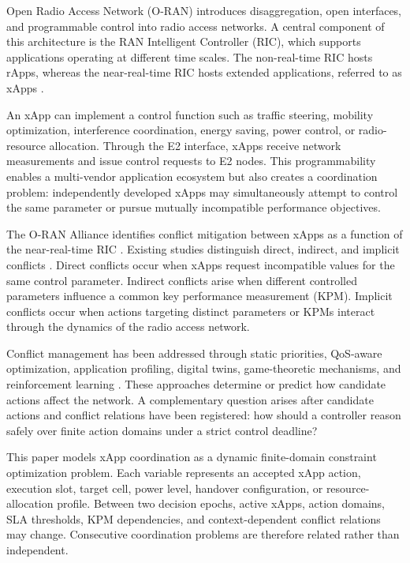 \documentclass[pdflatex,sn-mathphys-num,iicol,oneside]{sn-jnl}
\begin{document}
Open Radio Access Network (O-RAN) introduces disaggregation, open
interfaces, and programmable control into radio access networks.
A central component of this architecture is the RAN Intelligent
Controller (RIC), which supports applications operating at different
time scales. The non-real-time RIC hosts rApps, whereas the
near-real-time RIC hosts extended applications, referred to as xApps
\cite{polese2023oran}.

An xApp can implement a control function such as traffic steering,
mobility optimization, interference coordination, energy saving,
power control, or radio-resource allocation. Through the E2
interface, xApps receive network measurements and issue control
requests to E2 nodes. This programmability enables a multi-vendor
application ecosystem but also creates a coordination problem:
independently developed xApps may simultaneously attempt to control
the same parameter or pursue mutually incompatible performance
objectives.

The O-RAN Alliance identifies conflict mitigation between xApps as a
function of the near-real-time RIC \cite{oran2024conflict}. Existing
studies distinguish direct, indirect, and implicit conflicts
\cite{adamczyk2023conflict,wadud2024qacm}. Direct conflicts occur when
xApps request incompatible values for the same control parameter.
Indirect conflicts arise when different controlled parameters
influence a common key performance measurement (KPM). Implicit
conflicts occur when actions targeting distinct parameters or KPMs
interact through the dynamics of the radio access network.

Conflict management has been addressed through static priorities,
QoS-aware optimization, application profiling, digital twins,
game-theoretic mechanisms, and reinforcement learning
\cite{wadud2024qacm,prever2025pacifista,
giannopoulos2025comix,wadud2025mobility}. These approaches determine
or predict how candidate actions affect the network. A complementary
question arises after candidate actions and conflict relations have
been registered: how should a controller reason safely over finite
action domains under a strict control deadline?

This paper models xApp coordination as a dynamic finite-domain
constraint optimization problem. Each variable represents an accepted
xApp action, execution slot, target cell, power level, handover
configuration, or resource-allocation profile. Between two decision
epochs, active xApps, action domains, SLA thresholds, KPM dependencies,
and context-dependent conflict relations may change. Consecutive
coordination problems are therefore related rather than independent.
\end{document}
